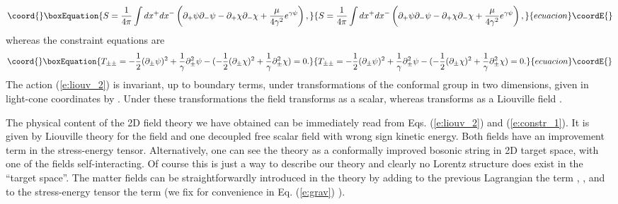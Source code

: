 \documentclass[a4paper,aps,prd,twocolumn,groupedaddress]{revtex4}
\begin{document}
\begin{equation}\coord{}\boxEquation{\label{e:liouv_2}S = \frac{1}{4\pi}\int dx^+dx^- \left(
\partial_+\psi\partial_-\psi
-\partial_+\chi\partial_-\chi
+\frac{\mu}{4\gamma^2}e^{\gamma\psi} \right),
}{S = \frac{1}{4\pi}\int dx^+dx^- \left(
\partial_+\psi\partial_-\psi
-\partial_+\chi\partial_-\chi
+\frac{\mu}{4\gamma^2}e^{\gamma\psi} \right),
}{ecuacion}\coordE{}\end{equation}
whereas the constraint equations are
\begin{equation}\coord{}\boxEquation{\label{e:constr_1}
T_{\pm\pm} = -\frac{1}{2}(\partial_\pm\psi)^2 +
\frac{1}{\gamma}\partial^2_\pm\psi - (-\frac{1}{2}(\partial_\pm\chi)^2
+ \frac{1}{\gamma}\partial^2_\pm\chi) =0.
}{T_{\pm\pm} = -\frac{1}{2}(\partial_\pm\psi)^2 +
\frac{1}{\gamma}\partial^2_\pm\psi - (-\frac{1}{2}(\partial_\pm\chi)^2
+ \frac{1}{\gamma}\partial^2_\pm\chi) =0.
}{ecuacion}\coordE{}\end{equation}
The action (\ref{e:liouv_2}) is invariant, up to boundary terms, under
transformations of the conformal group in two dimensions, given in
light-cone coordinates by \coordHE{}. Under
these transformations the field \myHighlight{$\chi$}\coordHE{} transforms as a scalar, whereas
\myHighlight{$\psi$}\coordHE{} transforms as a Liouville field \coordHE{}.

The physical content of the 2D field theory we have obtained can be
immediately read from Eqs. (\ref{e:liouv_2}) and (\ref{e:constr_1}).
It is given by Liouville theory for the field \myHighlight{$\psi$}\coordHE{} and one decoupled
free scalar field \myHighlight{$\chi$}\coordHE{} with wrong sign kinetic energy. Both fields
have an improvement term in the stress-energy tensor. Alternatively,
one can see the theory as a  conformally improved bosonic string in 2D
target space, with one of the fields self-interacting. Of course this
is just a way to describe our theory and clearly no Lorentz structure
does exist in the ``target space''. The \coordHE{} matter fields \myHighlight{$\varphi$}\coordHE{}
can be straightforwardly introduced in the theory by adding to the
previous Lagrangian the term \coordHE{}, \coordHE{}, and to the stress-energy
tensor the term \coordHE{} (we fix for
convenience in Eq. (\ref{e:grav}) \coordHE{}).
\end{document}
